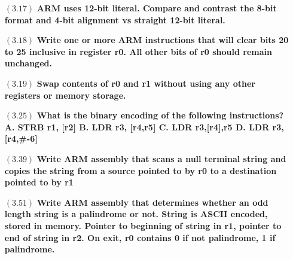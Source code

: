 \documentclass[letterpaper,10pt,titlepage]{article}
\def\braces#1{[#1]}
\begin{document}
\begin{enumerate}
\item[$(3.17)$] \textbf{ARM uses 12-bit literal. Compare and contrast the 8-bit format and 4-bit alignment vs straight 12-bit literal.}


  
\item[$(3.18)$] \textbf{Write one or more ARM instructions that will clear bits 20 to 25 inclusive in register r0. All other bits of r0 should remain unchanged.}


\item[$(3.19)$] \textbf{Swap contents of r0 and r1 without using any other registers or memory storage.}


\item[$(3.25)$] \textbf{What is the binary encoding of the following instructions? A. STRB r1, \braces{r2} B. LDR r3, \braces{r4,r5}\! C. LDR r3,\braces{r4},r5 D. LDR r3, \braces{r4,\#-6}\!}

\item[$(3.39)$] \textbf{Write ARM assembly that scans a null terminal string and copies the string from a source pointed to by r0 to a destination pointed to by r1}



\item[$(3.51)$] \textbf{Write ARM assembly that determines whether an odd length string is a palindrome or not. String is ASCII encoded, stored in memory. Pointer to beginning of string in r1, pointer to end of string in r2. On exit, r0 contains 0 if not palindrome, 1 if palindrome.}



\end{enumerate}
\end{document}
